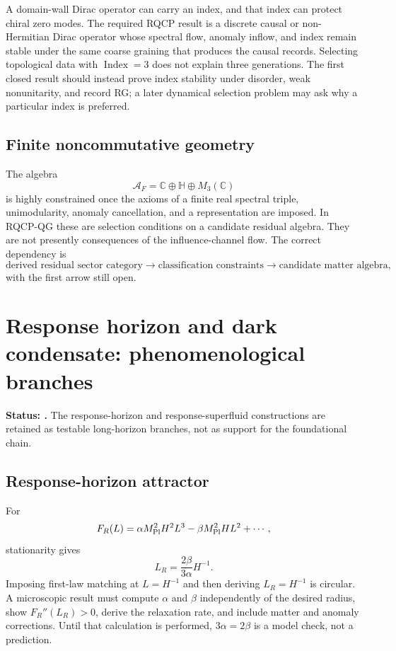 A domain-wall Dirac operator can carry an index, and that index can protect
chiral zero modes.  The required RQCP result is a discrete causal or
non-Hermitian Dirac operator whose spectral flow, anomaly inflow, and index
remain stable under the same coarse graining that produces the causal
records.  Selecting topological data with \(\operatorname{Index}=3\) does
not explain three generations.  The first closed result should instead prove
index stability under disorder, weak nonunitarity, and record RG; a later
dynamical selection problem may ask why a particular index is preferred.

\subsection{Finite noncommutative geometry}

The algebra
\[
 \mathcal A_F=\mathbb C\oplus\mathbb H\oplus M_3(\mathbb C)
\]
is highly constrained once the axioms of a finite real spectral triple,
unimodularity, anomaly cancellation, and a representation are imposed.  In
RQCP-QG these are selection conditions on a candidate residual algebra.
They are not presently consequences of the influence-channel flow.  The
correct dependency is
\[
 \text{derived residual sector category}
 \longrightarrow
 \text{classification constraints}
 \longrightarrow
 \text{candidate matter algebra},
\]
with the first arrow still open.

\section{Response horizon and dark condensate: phenomenological branches}
\label{sec:updated-cosmology}

\textbf{Status: \StatusOpen.}
The response-horizon and response-superfluid constructions are retained as
testable long-horizon branches, not as support for the foundational chain.

\subsection{Response-horizon attractor}

For
\begin{equation}
 F_R(L)=\alpha M_{\rm Pl}^2H^2L^3
 -\beta M_{\rm Pl}^2HL^2+\cdots ,
 \label{eq:updated-horizon-free-energy}
\end{equation}
stationarity gives
\[
 L_R=\frac{2\beta}{3\alpha}H^{-1}.
\]
Imposing first-law matching at \(L=H^{-1}\) and then deriving
\(L_R=H^{-1}\) is circular.  A microscopic result must compute
\(\alpha\) and \(\beta\) independently of the desired radius, show
\(F_R''(L_R)>0\), derive the relaxation rate, and include matter and anomaly
corrections.  Until that calculation is performed,
\(3\alpha=2\beta\) is a model check, not a prediction.

